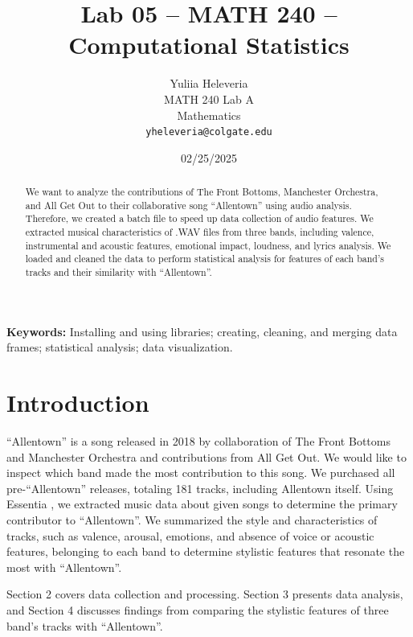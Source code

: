 \documentclass{article}\usepackage[]{graphicx}\usepackage[]{xcolor}
\begin{document}
\vspace{-1in}
\title{Lab 05 -- MATH 240 -- Computational Statistics}

\author{
  Yuliia Heleveria \\
  MATH 240 Lab A  \\
  Mathematics  \\
  {\tt yheleveria@colgate.edu}
}

\date{02/25/2025}

\maketitle

\begin{multicols}{2}
\begin{abstract}
We want to analyze the contributions of The Front Bottoms, Manchester Orchestra, and All Get Out to their collaborative song ``Allentown'' using audio analysis. Therefore, we created a batch file to speed up data collection of audio features. We extracted musical characteristics of .WAV files from three bands, including valence, instrumental and acoustic features, emotional impact, loudness, and lyrics analysis. We loaded and cleaned the data to perform statistical analysis for features of each band's tracks and their similarity with ``Allentown''. 
\end{abstract}

\noindent \textbf{Keywords:} Installing and using libraries; creating, cleaning, and merging data frames; statistical analysis; data visualization.

\section{Introduction}
``Allentown'' is a song released in 2018 by collaboration of The Front Bottoms and Manchester Orchestra and contributions from All Get Out. We would like to inspect which band made the most contribution to this song. We purchased all pre-``Allentown'' releases, totaling 181 tracks, including Allentown itself.
Using Essentia \citep{bogdanov2013essentia}, we extracted music data about given songs to determine the primary contributor to ``Allentown''. We summarized the style and characteristics of tracks, such as valence, arousal, emotions, and absence of voice or acoustic features, belonging to each band to determine stylistic features that resonate the most with ``Allentown''. 

Section 2 covers data collection and processing. Section 3 presents data analysis, and Section 4 discusses findings from comparing the stylistic features of three band's tracks with ``Allentown''.


\end{multicols}
\end{document}
